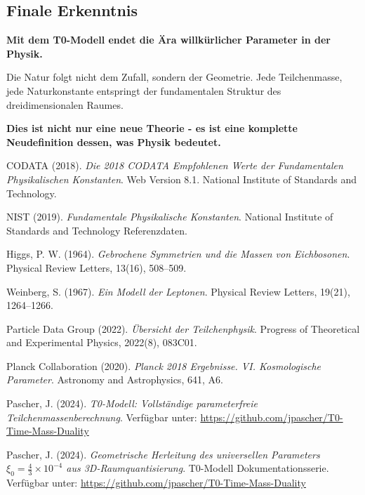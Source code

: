 \documentclass[12pt,a4paper]{article}
\begin{document}
	\subsection{Finale Erkenntnis}
	
	\begin{tcolorbox}[colback=orange!5!white,colframe=orange!75!black,title=Das Ende der Willkür]
		\textbf{Mit dem T0-Modell endet die Ära willkürlicher Parameter in der Physik.}
		
		Die Natur folgt nicht dem Zufall, sondern der Geometrie. Jede Teilchenmasse, jede Naturkonstante entspringt der fundamentalen Struktur des dreidimensionalen Raumes.
		
		\textbf{Dies ist nicht nur eine neue Theorie - es ist eine komplette Neudefinition dessen, was Physik bedeutet.}
	\end{tcolorbox}
	
	\newpage
	\begin{thebibliography}{99}
		
		CODATA (2018). \textit{Die 2018 CODATA Empfohlenen Werte der Fundamentalen Physikalischen Konstanten}. 
		Web Version 8.1. National Institute of Standards and Technology.
		
		NIST (2019). \textit{Fundamentale Physikalische Konstanten}. 
		National Institute of Standards and Technology Referenzdaten.
		
		Higgs, P. W. (1964). \textit{Gebrochene Symmetrien und die Massen von Eichbosonen}. 
		Physical Review Letters, 13(16), 508–509.
		
		Weinberg, S. (1967). \textit{Ein Modell der Leptonen}. 
		Physical Review Letters, 19(21), 1264–1266.
		
		Particle Data Group (2022). \textit{Übersicht der Teilchenphysik}. 
		Progress of Theoretical and Experimental Physics, 2022(8), 083C01.
		
		Planck Collaboration (2020). \textit{Planck 2018 Ergebnisse. VI. Kosmologische Parameter}. 
		Astronomy and Astrophysics, 641, A6.
		
		Pascher, J. (2024). \textit{T0-Modell: Vollständige parameterfreie Teilchenmassenberechnung}. 
		Verfügbar unter: \url{https://github.com/jpascher/T0-Time-Mass-Duality}
		
		Pascher, J. (2024). \textit{Geometrische Herleitung des universellen Parameters $\xi_0 = \frac{4}{3} \times 10^{-4}$ aus 3D-Raumquantisierung}. 
		T0-Modell Dokumentationsserie. Verfügbar unter: \url{https://github.com/jpascher/T0-Time-Mass-Duality}
		
	\end{thebibliography}
	
\end{document}
